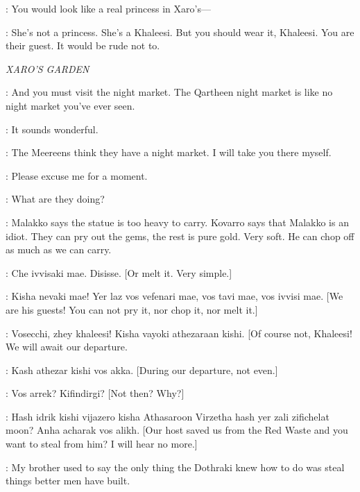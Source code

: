 \DOREAH: You would look like a real princess in Xaro's--- 

\IRRI: She's not a princess. She's a Khaleesi. But you should wear it, Khaleesi. You are their guest. It would be rude not to. 


\scene

\textit{XARO'S GARDEN} 


\QARTHEENWOMAN: And you must visit the night market. The Qartheen night market is like no night market you've ever seen. 

\DAENERYS: It sounds wonderful. 

\QARTHEENWOMAN: The Meereens think they have a night market. I will take you there myself. 


\DAENERYS: Please excuse me for a moment. 


\DAENERYS: What are they doing? 

\JORAH: Malakko says the statue is too heavy to carry. Kovarro says that Malakko is an idiot. They can pry out the gems, the rest is pure gold. Very soft. He can chop off as much as we can carry. 

\KOVARRO: Che ivvisaki mae. Disisse. [Or melt it. Very simple.] 

\DAENERYS: Kisha nevaki mae! Yer laz vos vefenari mae, vos tavi mae, vos ivvisi mae. [We are his guests! You can not pry it, nor chop it, nor melt it.] 

\KOVARRO: Vosecchi, zhey khaleesi! Kisha vayoki athezaraan kishi. [Of course not, Khaleesi! We will await our departure. 

\DAENERYS: Kash athezar kishi vos akka. [During our departure, not even.] 

\KOVARRO: Vos arrek? Kifindirgi? [Not then? Why?] 

\DAENERYS: Hash idrik kishi vijazero kisha Athasaroon Virzetha hash yer zali zifichelat moon? Anha acharak vos alikh. [Our host saved us from the Red Waste and you want to steal from him? I will hear no more.] 


\DAENERYS: My brother used to say the only thing the Dothraki knew how to do was steal things better men have built. 

